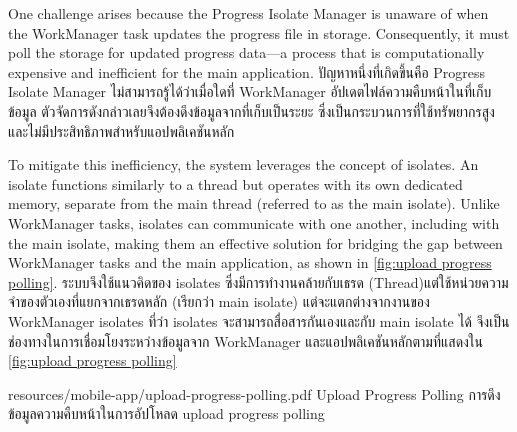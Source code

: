 \ifenglish
One challenge arises because the Progress Isolate Manager is unaware of when the WorkManager task updates the progress file in storage. Consequently, it must poll the storage for updated progress data—a process that is computationally expensive and inefficient for the main application.
\else
ปัญหาหนึ่งที่เกิดขึ้นคือ Progress Isolate Manager ไม่สามารถรู้ได้ว่าเมื่อใดที่ WorkManager อัปเดตไฟล์ความคืบหน้าในที่เก็บข้อมูล ตัวจัดการดังกล่าวเลยจึงต้องดึงข้อมูลจากที่เก็บเป็นระยะ ซึ่งเป็นกระบวนการที่ใช้ทรัพยากรสูงและไม่มีประสิทธิภาพสำหรับแอปพลิเคชันหลัก
\fi

\ifenglish
To mitigate this inefficiency, the system leverages the concept of isolates. An isolate functions similarly to a thread but operates with its own dedicated memory, separate from the main thread (referred to as the main isolate). Unlike WorkManager tasks, isolates can communicate with one another, including with the main isolate, making them an effective solution for bridging the gap between WorkManager tasks and the main application, as shown in \autoref{fig:upload progress polling}.
\else
ระบบจึงใช้แนวคิดของ isolates ซึ่งมีการทำงานคล้ายกับเธรด (Thread)แต่ใช้หน่วยความจำของตัวเองที่แยกจากเธรดหลัก (เรียกว่า main isolate) แต่จะแตกต่างจากงานของ WorkManager isolates ที่ว่า isolates จะสามารถสื่อสารกันเองและกับ main isolate ได้ จึงเป็นช่องทางในการเชื่อมโยงระหว่างข้อมูลจาก WorkManager และแอปพลิเคชันหลักตามที่แสดงใน \autoref{fig:upload progress polling}
\fi

\insertPDFfigure
{resources/mobile-app/upload-progress-polling.pdf}
{\ifenglish Upload Progress Polling \else การดึงข้อมูลความคืบหน้าในการอัปโหลด \fi}
{upload progress polling}
